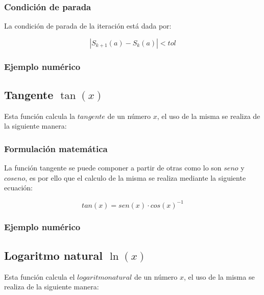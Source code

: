 \documentclass[10pt,a4paper]{article}
\begin{document}
	\subsubsection{Condición de parada}
	
	La condición de parada de la iteración está dada por: 
	
	\begin{equation}\label{key9}
		\left\lvert S_{k+1}(a) - S_{k}(a) \right\lvert < tol
	\end{equation}
	
	\subsubsection{Ejemplo numérico}
	
	\subsection{Tangente $\tan(x)$}
	
	Esta función calcula la $tangente$ de un número $x$, el uso de la misma se realiza de la siguiente manera:
	
	\begin{center}
	\end{center}
	
	\subsubsection{Formulación matemática}
	
	La función tangente se puede componer a partir de otras como lo son $seno$ y $coseno$, es por ello que el calculo de la misma se realiza mediante la siguiente ecuación:
	
	\begin{equation}\label{key10}
		tan(x) = sen(x)\cdot cos(x)^{-1}
	\end{equation}
	
	\subsubsection{Ejemplo numérico}
	
	\subsection{Logaritmo natural $\ln(x)$}
	
	Esta función calcula el $logaritmo natural$ de un número $x$, el uso de la misma se realiza de la siguiente manera:
	
\end{document}

